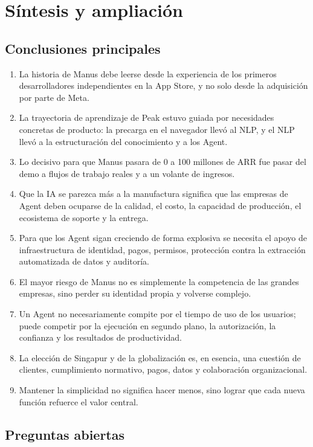 \section{Síntesis y ampliación}

\subsection{Conclusiones principales}

\begin{enumerate}
\item La historia de Manus debe leerse desde la experiencia de los primeros desarrolladores independientes en la App Store, y no solo desde la adquisición por parte de Meta.
\item La trayectoria de aprendizaje de Peak estuvo guiada por necesidades concretas de producto: la precarga en el navegador llevó al NLP, y el NLP llevó a la estructuración del conocimiento y a los Agent.
\item Lo decisivo para que Manus pasara de 0 a 100 millones de ARR fue pasar del demo a flujos de trabajo reales y a un volante de ingresos.
\item Que la IA se parezca más a la manufactura significa que las empresas de Agent deben ocuparse de la calidad, el costo, la capacidad de producción, el ecosistema de soporte y la entrega.
\item Para que los Agent sigan creciendo de forma explosiva se necesita el apoyo de infraestructura de identidad, pagos, permisos, protección contra la extracción automatizada de datos y auditoría.
\item El mayor riesgo de Manus no es simplemente la competencia de las grandes empresas, sino perder su identidad propia y volverse complejo.
\item Un Agent no necesariamente compite por el tiempo de uso de los usuarios; puede competir por la ejecución en segundo plano, la autorización, la confianza y los resultados de productividad.
\item La elección de Singapur y de la globalización es, en esencia, una cuestión de clientes, cumplimiento normativo, pagos, datos y colaboración organizacional.
\item Mantener la simplicidad no significa hacer menos, sino lograr que cada nueva función refuerce el valor central.
\end{enumerate}

\subsection{Preguntas abiertas}

